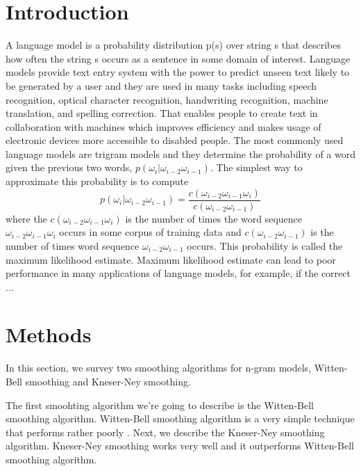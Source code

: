 \documentclass[twoside]{article}
\begin{document}
\begin{multicols}{2}

\section{Introduction}
A language model is a probability distribution p(s) over string s that describes how often the string s occurs as a sentence in some domain of interest. 
Language models provide text entry system with the power to predict unseen text likely to be generated by a user and they are used in many tasks including speech recognition, optical character recognition, handwriting recognition, machine translation, and spelling correction.  That enables people to create text in collaboration with machines which improves efficiency and makes usage of electronic devices more accessible to disabled people. The most commonly used language models are trigram models and they determine the probability of a word given the previous two words, $ p(\omega_i|\omega_{i-2}\omega_{i-1}) $. The simplest way to approximate this probability is to compute 
\begin{equation}
p(\omega_i|\omega_{i-2}\omega_{i-1}) = \frac{c(\omega_{i-2}\omega_{i-1}\omega_i)}{c(\omega_{i-2}\omega_{i-1})}
\end{equation}
where the $ c(\omega_{i-2}\omega_{i-1}\omega_i) $ is the number of times the word sequence $ \omega_{i-2}\omega_{i-1}\omega_i $ occurs in some corpus of training data and $ c(\omega_{i-2}\omega_{i-1}) $ is the number of times word sequence $ \omega_{i-2}\omega_{i-1} $ occurs. This probability is called the maximum likelihood estimate. Maximum likelihood estimate can lead to poor performance in many applications of language models, for example, if the correct ... 

\section{Methods}

In this section, we survey two smoothing algorithms for n-gram models, Witten-Bell smoothing and Kneser-Ney smoothing. 

The first smoohting algorithm we\rq{}re going to describe is the Witten-Bell smoothing algorithm. Witten-Bell smoothing algorithm is a very simple technique that performs rather poorly \cite{chen1999empirical}. Next, we describe the Kneser-Ney smoothing algorithm. Kneser-Ney smoothing works very well and it outperforms Witten-Bell smoothing algorithm.


\end{multicols}
\end{document}
